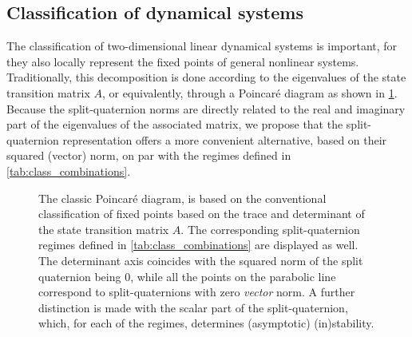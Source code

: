 
\subsection{Classification of dynamical systems}
\label{ssec:system_classification}
The classification of two-dimensional linear dynamical systems is important, for they also locally represent the fixed points of general nonlinear systems. Traditionally, this decomposition is done according to the eigenvalues of the state transition matrix \(A\), or equivalently, through a Poincaré diagram as shown in \cref{fig:poincare_diagram}. Because the split-quaternion norms are directly related to the real and imaginary part of the eigenvalues of the associated matrix, we propose that the split-quaternion representation offers a more convenient alternative, based on their squared (vector) norm, on par with the regimes defined in \cref{tab:class_combinations}.
\begin{figure}[ht!]
    \centering
    
    \caption{The classic Poincaré diagram, is based on the conventional classification of fixed points based on the trace and determinant of the state transition matrix \(A\). The corresponding split-quaternion regimes defined in \cref{tab:class_combinations} are displayed as well. The determinant axis coincides with the squared norm of the split quaternion being 0, while all the points on the parabolic line correspond to split-quaternions with zero \emph{vector} norm. A further distinction is made with the scalar part of the split-quaternion, which, for each of the regimes, determines (asymptotic) (in)stability.}
    \label{fig:poincare_diagram}
\end{figure}

